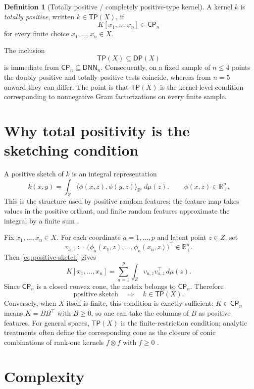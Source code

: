 \documentclass[11pt]{article}
\newcommand{\R}{\mathbb{R}}
\newcommand{\Rp}{\mathbb{R}_{+}}
\newcommand{\DNN}{\mathsf{DNN}}
\newcommand{\CP}{\mathsf{CP}}
\newcommand{\DP}{\mathsf{DP}}
\newcommand{\TP}{\mathsf{TP}}
\theoremstyle{definition}
\newtheorem{definition}{Definition}
\theoremstyle{plain}
\theoremstyle{remark}
\begin{document}
\begin{definition}[Totally positive / completely positive-type kernel]
A kernel $k$ is \emph{totally positive}, written $k\in\TP(X)$, if
\[
K[x_1,\dots,x_n]\in\CP_n
\]
for every finite choice $x_1,\dots,x_n\in X$.
\end{definition}

The inclusion
\[
\TP(X)\subseteq\DP(X)
\]
is immediate from $\CP_n\subseteq\DNN_n$.  Consequently, on a fixed sample of
$n\le4$ points the doubly positive and totally positive tests coincide, whereas
from $n=5$ onward they can differ.  The point is that $\TP(X)$ is the
kernel-level condition corresponding to nonnegative Gram factorizations on every
finite sample.

\section{Why total positivity is the sketching condition}

A positive sketch of $k$ is an integral representation
\begin{equation}\label{eq:positive-sketch}
 k(x,y)
 =
 \int_Z \langle \phi(x,z),\phi(y,z)\rangle_{\R^p}\,d\mu(z),
 \qquad
 \phi(x,z)\in\Rp^p.
\end{equation}
This is the structure used by positive random features: the feature map takes
values in the positive orthant, and finite random features approximate the
integral by a finite sum \cite{ScetbonCuturi2020}.

Fix $x_1,\dots,x_n\in X$.  For each coordinate $a=1,\dots,p$ and latent point
$z\in Z$, set
\[
v_{a,z}:=\big(\phi_a(x_1,z),\dots,\phi_a(x_n,z)\big)^\top\in\Rp^n.
\]
Then \eqref{eq:positive-sketch} gives
\[
K[x_1,\dots,x_n]
=
\sum_{a=1}^p\int_Z v_{a,z}v_{a,z}^\top\,d\mu(z).
\]
Since $\CP_n$ is a closed convex cone, the matrix belongs to $\CP_n$.
Therefore
\[
\boxed{\text{positive sketch} \quad\Longrightarrow\quad k\in\TP(X).}
\]
Conversely, when $X$ itself is finite, this condition is exactly sufficient:
$K\in\CP_n$ means $K=BB^\top$ with $B\ge0$, so one can take the columns of $B$
as positive features.  For general spaces, $\TP(X)$ is the finite-restriction
condition; analytic treatments often define the corresponding cone as the
closure of conic combinations of rank-one kernels $f\otimes f$ with $f\ge0$
\cite{DeCorte2022}.

\section{Complexity}
\end{document}
